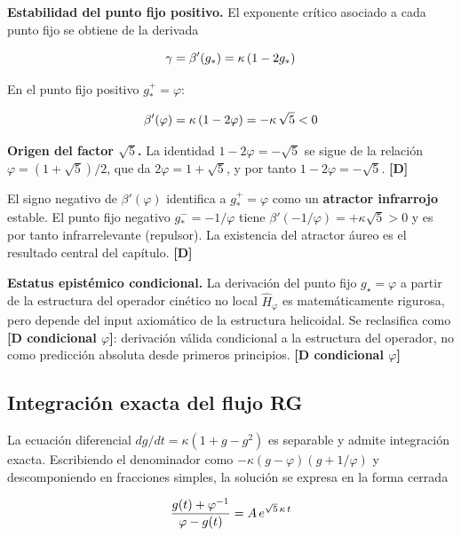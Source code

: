 ﻿\documentclass[11pt,letterpaper]{article}
\begin{document}
\textbf{Estabilidad del punto fijo positivo.} El exponente crítico asociado a cada punto fijo se obtiene de la derivada

\begin{equation*}
  \resizebox{\ifdim\width>\linewidth \linewidth\else\width\fi}{!}{$\displaystyle \gamma = \beta'(g_*) = \kappa\,(1 - 2g_*)$}
\end{equation*}

En el punto fijo positivo $g_*^+ = \varphi$:

\begin{equation*}
  \resizebox{\ifdim\width>\linewidth \linewidth\else\width\fi}{!}{$\displaystyle \beta'(\varphi) = \kappa\,(1 - 2\varphi) = -\kappa\,\sqrt{5} < 0$}
\end{equation*}

\textbf{Origen del factor $\sqrt{5}$.} La identidad $1 - 2\varphi = -\sqrt{5}$ se sigue de la relación $\varphi = (1 + \sqrt{5})/2$, que da $2\varphi = 1 + \sqrt{5}$, y por tanto $1 - 2\varphi = -\sqrt{5}$. \textbf{[D]}

El signo negativo de $\beta'(\varphi)$ identifica a $g_*^+ = \varphi$ como un \textbf{atractor infrarrojo} estable. El punto fijo negativo $g_*^- = -1/\varphi$ tiene $\beta'(-1/\varphi) = +\kappa\sqrt{5} > 0$ y es por tanto infrarrelevante (repulsor). La existencia del atractor áureo es el resultado central del capítulo. \textbf{[D]}

\textbf{Estatus epistémico condicional.} La derivación del punto fijo $g_\star = \varphi$ a partir de la estructura del operador cinético no local $\hat{H}_\varphi$ es matemáticamente rigurosa, pero depende del input axiomático de la estructura helicoidal. Se reclasifica como \textbf{[D condicional $\varphi$]}: derivación válida condicional a la estructura del operador, no como predicción absoluta desde primeros principios. \textbf{[D condicional $\varphi$]}
\subsection{Integración exacta del flujo RG}
La ecuación diferencial $dg/dt = \kappa(1 + g - g^2)$ es separable y admite integración exacta. Escribiendo el denominador como $-\kappa(g - \varphi)(g + 1/\varphi)$ y descomponiendo en fracciones simples, la solución se expresa en la forma cerrada

\begin{equation*}
  \resizebox{\ifdim\width>\linewidth \linewidth\else\width\fi}{!}{$\displaystyle \frac{g(t) + \varphi^{-1}}{\varphi - g(t)} = A\,e^{\sqrt{5}\,\kappa\,t}$}
\end{equation*}
\end{document}
